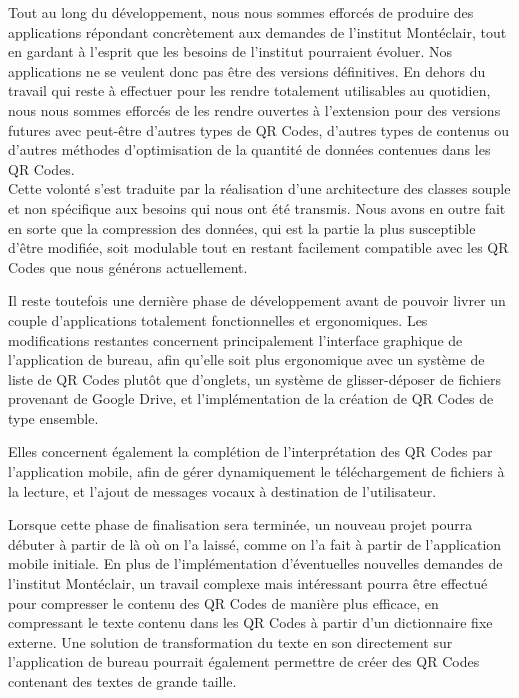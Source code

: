 \par
Tout au long du développement, nous nous sommes efforcés de produire des applications répondant concrètement aux demandes de l'institut Montéclair, tout en gardant à l'esprit que les besoins de l'institut pourraient évoluer. Nos applications ne se veulent donc pas être des versions définitives. En dehors du travail qui reste à effectuer pour les rendre totalement utilisables au quotidien, nous nous sommes efforcés de les rendre ouvertes à l'extension pour des versions futures avec peut-être d'autres types de QR Codes, d'autres types de contenus ou d'autres méthodes d'optimisation de la quantité de données contenues dans les QR Codes.\\
Cette volonté s'est traduite par la réalisation d'une architecture des classes souple et non spécifique aux besoins qui nous ont été transmis. Nous avons en outre fait en sorte que la compression des données, qui est la partie la plus susceptible d'être modifiée, soit modulable tout en restant facilement compatible avec les QR Codes que nous générons actuellement.\\

\par
Il reste toutefois une dernière phase de développement avant de pouvoir livrer un couple d'applications totalement fonctionnelles et ergonomiques. Les modifications restantes concernent principalement l'interface graphique de l'application de bureau, afin qu'elle soit plus ergonomique avec un système de liste de QR Codes plutôt que d'onglets, un système de glisser-déposer de fichiers provenant de Google Drive, et l'implémentation de la création de QR Codes de type ensemble.
\par
Elles concernent également la complétion de l'interprétation des QR Codes par l'application mobile, afin de gérer dynamiquement le téléchargement de fichiers à la lecture, et l'ajout de messages vocaux à destination de l'utilisateur.\\

\par
Lorsque cette phase de finalisation sera terminée, un nouveau projet pourra débuter à partir de là où on l'a laissé, comme on l'a fait à partir de l'application mobile initiale. En plus de l'implémentation d'éventuelles nouvelles demandes de l'institut Montéclair, un travail complexe mais intéressant pourra être effectué pour compresser le contenu des QR Codes de manière plus efficace, en compressant le texte contenu dans les QR Codes à partir d'un dictionnaire fixe externe. Une solution de transformation du texte en son directement sur l'application de bureau pourrait également permettre de créer des QR Codes contenant des textes de grande taille.